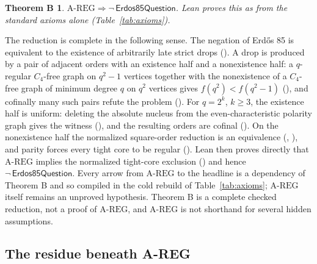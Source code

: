 \documentclass{anvil-paper}
\newcommand{\AREG}{\mathrm{A\text{-}REG}}
\newcommand{\Qn}{\textsf{Erdos85Question}}
\newtheorem*{theoremB}{Theorem B}
\theoremstyle{definition}
\begin{document}
\begin{theoremB}
$\AREG\Rightarrow\neg\,\Qn$. Lean proves this as  from the standard axioms alone (Table~\ref{tab:axioms}).
\end{theoremB}

The reduction is complete in the following sense. The negation of Erdős 85 is equivalent to the existence of arbitrarily late strict drops (). A drop is produced by a pair of adjacent orders with an existence half and a nonexistence half: a $q$-regular $C_4$-free graph on $q^2-1$ vertices together with the nonexistence of a $C_4$-free graph of minimum degree $q$ on $q^2$ vertices gives $f(q^2)<f(q^2-1)$ (), and cofinally many such pairs refute the problem (). For $q=2^k$, $k\ge 3$, the existence half is uniform: deleting the absolute nucleus from the even-characteristic polarity graph gives the witness (), and the resulting orders are cofinal (). On the nonexistence half the normalized square-order reduction is an equivalence (, ), and parity forces every tight core to be regular (). Lean then proves directly that $\AREG$ implies the normalized tight-core exclusion () and hence $\neg\,\Qn$. Every arrow from $\AREG$ to the headline is a dependency of Theorem B and so compiled in the cold rebuild of Table~\ref{tab:axioms}; $\AREG$ itself remains an unproved hypothesis. Theorem B is a complete checked reduction, not a proof of $\AREG$, and $\AREG$ is not shorthand for several hidden assumptions.

\subsection{The residue beneath A-REG}\label{sec:residue}
\end{document}

